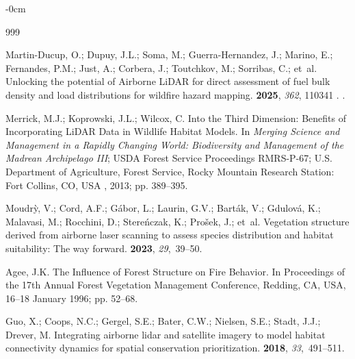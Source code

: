 \documentclass[remotesensing,article,accept,pdftex,moreauthors]{Definitions/mdpi}
\begin{document}
\begin{adjustwidth}{-\extralength}{0cm}
  \begin{thebibliography}{999}

Martin-Ducup, O.; Dupuy, J.L.; Soma, M.; Guerra-Hernandez, J.; Marino, E.;
  Fernandes, P.M.; Just, A.; Corbera, J.; Toutchkov, M.; Sorribas, C.;  et~al.
\newblock Unlocking the potential of Airborne {LiDAR} for direct assessment of
  fuel bulk density and load distributions for wildfire hazard mapping.
 {\bf 2025}, {\em
  362}, 110341
.
.

Merrick, M.J.; Koprowski, J.L.; Wilcox, C.
\newblock Into the Third Dimension: Benefits of Incorporating {LiDAR} Data in
  Wildlife Habitat Models.
\newblock In \emph{Merging Science and Management in a Rapidly
  Changing World: Biodiversity and Management of the Madrean Archipelago III}; USDA Forest Service Proceedings RMRS-P-67; U.S. Department of Agriculture, Forest Service, Rocky Mountain Research Station: Fort Collins, CO, USA
, 2013; pp. 389--395.

Moudr{\`y}, V.; Cord, A.F.; G{\'a}bor, L.; Laurin, G.V.; Bart{\'a}k, V.;
  Gdulov{\'a}, K.; Malavasi, M.; Rocchini, D.; Stere{\'n}czak, K.;
  Pro{\v{s}}ek, J.;  et~al.
\newblock Vegetation structure derived from airborne laser scanning to assess
  species distribution and habitat suitability: The way forward.
 {\bf 2023}, {\em 29},~39--50.

Agee, J.K.
\newblock The Influence of Forest Structure on Fire Behavior. In Proceedings of the 17th Annual Forest Vegetation Management Conference, Redding, CA, USA, 16–18 January
 1996;
\newblock pp. 52--68.

Guo, X.; Coops, N.C.; Gergel, S.E.; Bater, C.W.; Nielsen, S.E.; Stadt, J.J.;
  Drever, M.
\newblock Integrating airborne lidar and satellite imagery to model habitat
  connectivity dynamics for spatial conservation prioritization.
 {\bf 2018}, {\em 33},~491--511.


\end{thebibliography}
\end{adjustwidth}
\end{document}
